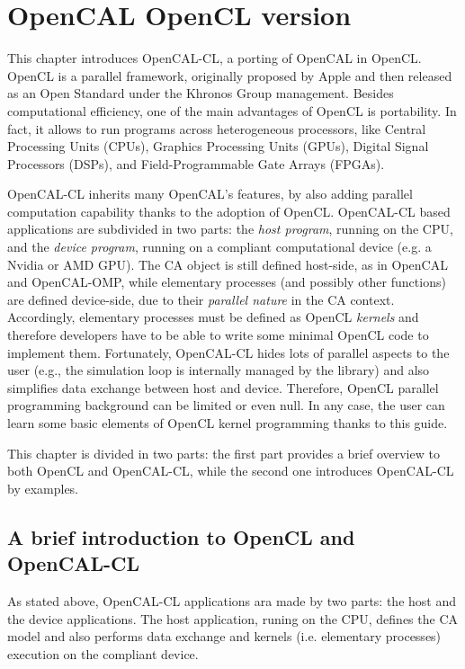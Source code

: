 \chapter{OpenCAL OpenCL version}\label{ch:opencal-cl}


This chapter introduces OpenCAL-CL, a porting of OpenCAL in
OpenCL. OpenCL is a parallel framework, originally proposed by Apple
and then released as an Open Standard under the Khronos Group
management. Besides computational efficiency, one of the main
advantages of OpenCL is portability. In fact, it allows to run
programs across heterogeneous processors, like Central Processing Units
(CPUs), Graphics Processing Units (GPUs), Digital Signal Processors
(DSPs), and Field-Programmable Gate Arrays (FPGAs).

OpenCAL-CL inherits many OpenCAL's features, by also adding parallel
computation capability thanks to the adoption of OpenCL. OpenCAL-CL
based applications are subdivided in two parts: the \emph{host
  program}, running on the CPU, and the \emph{device program}, running
on a compliant computational device (e.g. a Nvidia or AMD GPU). The CA
object is still defined host-side, as in OpenCAL and OpenCAL-OMP,
while elementary processes (and possibly other functions) are defined
device-side, due to their \textsl{parallel nature} in the CA
context. Accordingly, elementary processes must be defined as OpenCL
\emph{kernels} and therefore developers have to be able to write some
minimal OpenCL code to implement them. Fortunately, OpenCAL-CL hides
lots of parallel aspects to the user (e.g., the simulation loop is
internally managed by the library) and also simplifies data exchange
between host and device. Therefore, OpenCL parallel programming
background can be limited or even null. In any case, the user can
learn some basic elements of OpenCL kernel programming thanks to this
guide.

This chapter is divided in two parts: the first part provides a brief
overview to both OpenCL and OpenCAL-CL, while the second one
introduces OpenCAL-CL by examples.


\section{A brief introduction to OpenCL and OpenCAL-CL}\label{sec:opencalclstructure}

As stated above, OpenCAL-CL applications ara made by two parts: the
host and the device applications. The host application, runing on the
CPU, defines the CA model and also performs data exchange and kernels
(i.e. elementary processes) execution on the compliant device.

